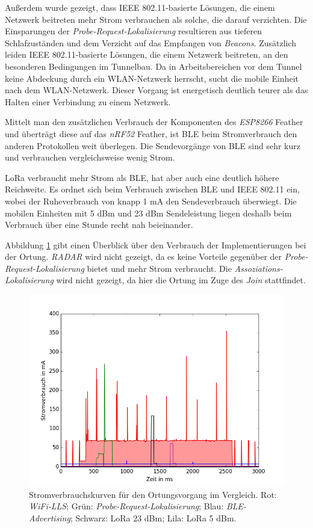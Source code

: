 Außerdem wurde gezeigt, dass IEEE 802.11-basierte Lösungen, die einem Netzwerk beitreten mehr Strom verbrauchen als solche, die darauf verzichten.
Die Einsparungen der \emph{Probe-Request-Lokalisierung} resultieren aus tieferen Schlafzuständen und dem Verzicht auf das Empfangen von \emph{Beacons}.
Zusätzlich leiden IEEE 802.11-basierte Lösungen, die einem Netzwerk beitreten, an den besonderen Bedingungen im Tunnelbau.
Da in Arbeitsbereichen vor dem Tunnel keine Abdeckung durch ein WLAN-Netzwerk herrscht, sucht die mobile Einheit nach dem WLAN-Netzwerk.
Dieser Vorgang ist energetisch deutlich teurer als das Halten einer Verbindung zu einem Netzwerk.

Mittelt man den zusätzlichen Verbrauch der Komponenten des \emph{ESP8266} Feather und überträgt diese auf das \emph{nRF52} Feather, ist BLE beim Stromverbrauch den anderen Protokollen weit überlegen.
Die Sendevorgänge von BLE sind sehr kurz und verbrauchen vergleichsweise wenig Strom.

LoRa verbraucht mehr Strom als BLE, hat aber auch eine deutlich höhere Reichweite.
Es ordnet sich beim Verbrauch zwischen BLE und IEEE 802.11 ein, wobei der Ruheverbrauch von knapp 1 mA den Sendeverbrauch überwiegt. 
Die mobilen Einheiten mit 5 dBm und 23 dBm Sendeleistung liegen deshalb beim Verbrauch über eine Stunde recht nah beieinander.

Abbildung \ref{fig:alle} gibt einen Überblick über den Verbrauch der Implementierungen bei der Ortung. 
\emph{RADAR} wird nicht gezeigt, da es keine Vorteile gegenüber der \emph{Probe-Request-Lokalisierung} bietet und mehr Strom verbraucht.
Die \emph{Assoziations-Lokalisierung} wird nicht gezeigt, da hier die Ortung im Zuge des \emph{Join} stattfindet.

\begin{figure}[h!]
  \centering
	\includegraphics[width=\textwidth]{plots/alle.png}
  \caption{Stromverbrauchskurven für den Ortungsvorgang im Vergleich. Rot: \emph{WiFi-LLS}; Grün: \emph{Probe-Request-Lokalisierung}; Blau: \emph{BLE-Advertising}; Schwarz: LoRa 23 dBm; Lila: LoRa 5 dBm.}
  \label{fig:alle}
\end{figure}


